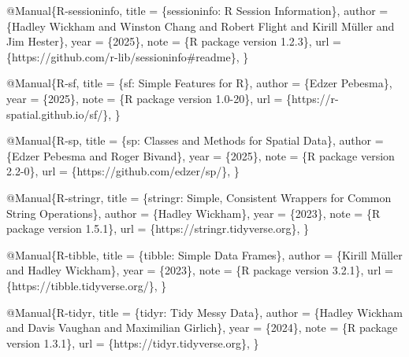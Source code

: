 \documentclass[
]{article}
\newenvironment{Shaded}{\begin{snugshade}}{\end{snugshade}}
\newcommand{\DataTypeTok}[1]{\textcolor[rgb]{0.13,0.29,0.53}{#1}}
\newcommand{\NormalTok}[1]{#1}
\newcommand{\OtherTok}[1]{\textcolor[rgb]{0.56,0.35,0.01}{#1}}
\newcommand{\VariableTok}[1]{\textcolor[rgb]{0.00,0.00,0.00}{#1}}
\begin{document}
\begin{Shaded}
\begin{Highlighting}[]
\VariableTok{@Manual}\NormalTok{\{}\OtherTok{R}\NormalTok{{-}}\OtherTok{sessioninfo}\NormalTok{,}
  \DataTypeTok{title}\NormalTok{ = \{sessioninfo: R Session Information\},}
  \DataTypeTok{author}\NormalTok{ = \{Hadley Wickham and Winston Chang and Robert Flight and Kirill Müller and Jim Hester\},}
  \DataTypeTok{year}\NormalTok{ = \{2025\},}
  \DataTypeTok{note}\NormalTok{ = \{R package version 1.2.3\},}
  \DataTypeTok{url}\NormalTok{ = \{https://github.com/r{-}lib/sessioninfo\#readme\},}
\NormalTok{\}}

\VariableTok{@Manual}\NormalTok{\{}\OtherTok{R}\NormalTok{{-}}\OtherTok{sf}\NormalTok{,}
  \DataTypeTok{title}\NormalTok{ = \{sf: Simple Features for R\},}
  \DataTypeTok{author}\NormalTok{ = \{Edzer Pebesma\},}
  \DataTypeTok{year}\NormalTok{ = \{2025\},}
  \DataTypeTok{note}\NormalTok{ = \{R package version 1.0{-}20\},}
  \DataTypeTok{url}\NormalTok{ = \{https://r{-}spatial.github.io/sf/\},}
\NormalTok{\}}

\VariableTok{@Manual}\NormalTok{\{}\OtherTok{R}\NormalTok{{-}}\OtherTok{sp}\NormalTok{,}
  \DataTypeTok{title}\NormalTok{ = \{sp: Classes and Methods for Spatial Data\},}
  \DataTypeTok{author}\NormalTok{ = \{Edzer Pebesma and Roger Bivand\},}
  \DataTypeTok{year}\NormalTok{ = \{2025\},}
  \DataTypeTok{note}\NormalTok{ = \{R package version 2.2{-}0\},}
  \DataTypeTok{url}\NormalTok{ = \{https://github.com/edzer/sp/\},}
\NormalTok{\}}

\VariableTok{@Manual}\NormalTok{\{}\OtherTok{R}\NormalTok{{-}}\OtherTok{stringr}\NormalTok{,}
  \DataTypeTok{title}\NormalTok{ = \{stringr: Simple, Consistent Wrappers for Common String Operations\},}
  \DataTypeTok{author}\NormalTok{ = \{Hadley Wickham\},}
  \DataTypeTok{year}\NormalTok{ = \{2023\},}
  \DataTypeTok{note}\NormalTok{ = \{R package version 1.5.1\},}
  \DataTypeTok{url}\NormalTok{ = \{https://stringr.tidyverse.org\},}
\NormalTok{\}}

\VariableTok{@Manual}\NormalTok{\{}\OtherTok{R}\NormalTok{{-}}\OtherTok{tibble}\NormalTok{,}
  \DataTypeTok{title}\NormalTok{ = \{tibble: Simple Data Frames\},}
  \DataTypeTok{author}\NormalTok{ = \{Kirill Müller and Hadley Wickham\},}
  \DataTypeTok{year}\NormalTok{ = \{2023\},}
  \DataTypeTok{note}\NormalTok{ = \{R package version 3.2.1\},}
  \DataTypeTok{url}\NormalTok{ = \{https://tibble.tidyverse.org/\},}
\NormalTok{\}}

\VariableTok{@Manual}\NormalTok{\{}\OtherTok{R}\NormalTok{{-}}\OtherTok{tidyr}\NormalTok{,}
  \DataTypeTok{title}\NormalTok{ = \{tidyr: Tidy Messy Data\},}
  \DataTypeTok{author}\NormalTok{ = \{Hadley Wickham and Davis Vaughan and Maximilian Girlich\},}
  \DataTypeTok{year}\NormalTok{ = \{2024\},}
  \DataTypeTok{note}\NormalTok{ = \{R package version 1.3.1\},}
  \DataTypeTok{url}\NormalTok{ = \{https://tidyr.tidyverse.org\},}
\NormalTok{\}}


\end{Highlighting}
\end{Shaded}
\end{document}
